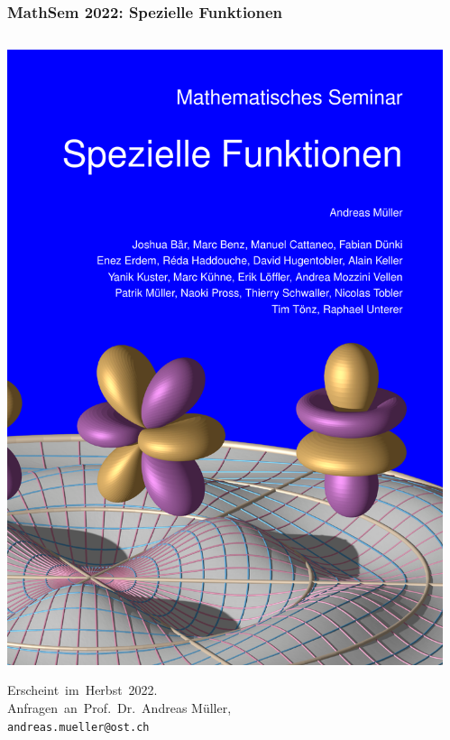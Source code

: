 \documentclass[handout]{beamer}
\title[]{}
\begin{document}
\begin{frame}
\frametitle{%
MathSem 2022: Spezielle Funktionen}
\begin{columns}[t,onlytextwidth]
\begin{column}{0.32\textwidth}
\begin{center}
\includegraphics[width=\hsize]{../cover/buchcover.png}
\end{center}
\vskip 0.2cm
\bigskip
\bigskip
Erscheint~im~Herbst~2022.\\
Anfragen~an~Prof.~Dr.~Andreas Müller,\\
{\texttt{andreas.mueller@ost.ch}}
\bigskip
\bigskip
\bigskip
\end{column}
\begin{column}{0.65\textwidth}
\begin{description}

\end{description}
\end{column}
\end{columns}
\end{frame}
\end{document}
